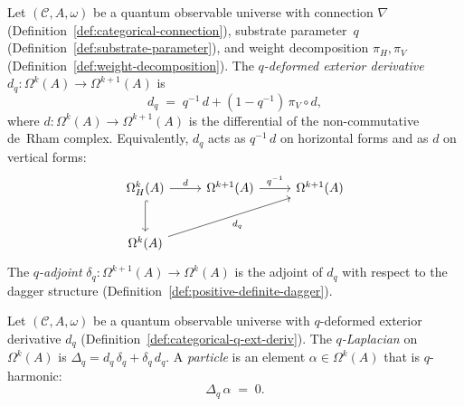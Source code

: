 \begin{definition}
\label{def:categorical-q-ext-deriv}
\leanok
Let $(\mathcal{C}, A, \omega)$ be a quantum observable universe with
connection $\nabla$ (Definition~\ref{def:categorical-connection}),
substrate parameter~$q$ (Definition~\ref{def:substrate-parameter}),
and weight decomposition $\pi_H, \pi_V$
(Definition~\ref{def:weight-decomposition}).  The \emph{$q$-deformed
exterior derivative} $d_q \colon \Omega^k(A) \to \Omega^{k+1}(A)$ is
\[
  d_q \;=\; q^{-1}\,d + (1 - q^{-1})\,\pi_V \circ d,
\]
where $d \colon \Omega^k(A) \to \Omega^{k+1}(A)$ is the differential
of the non-commutative de~Rham complex.  Equivalently, $d_q$ acts as
$q^{-1}\,d$ on horizontal forms and as $d$ on vertical forms:
\begin{equation}\label{eq:categorical-dq-cd}
\begin{tikzcd}[row sep=2.5em, column sep=2.5em]
  \Omega^k_H(A) \ar[r, "d"] \ar[d, hook]
  & \Omega^{k+1}(A) \ar[r, "q^{-1}"]
  & \Omega^{k+1}(A) \\
  \Omega^k(A) \ar[rru, "d_q"']
\end{tikzcd}
\end{equation}
The \emph{$q$-adjoint} $\delta_q \colon \Omega^{k+1}(A) \to \Omega^k(A)$
is the adjoint of $d_q$ with respect to the dagger structure
(Definition~\ref{def:positive-definite-dagger}).
\end{definition}

\begin{definition}[Particle]
\label{def:q-harmonic-form}
\leanok
Let $(\mathcal{C}, A, \omega)$ be a quantum observable universe with
$q$-deformed exterior derivative $d_q$
(Definition~\ref{def:categorical-q-ext-deriv}).  The \emph{$q$-Laplacian}
on $\Omega^k(A)$ is $\Delta_q = d_q\,\delta_q + \delta_q\,d_q$.
A \emph{particle} is an element $\alpha \in \Omega^k(A)$ that is
$q$-harmonic:
\[
  \Delta_q\,\alpha \;=\; 0.
\]
\end{definition}

